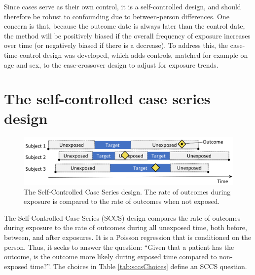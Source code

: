 \documentclass[11pt]{book}
\begin{document}
Since cases serve as their own control, it is a self-controlled design,
and should therefore be robust to confounding due to between-person
differences. One concern is that, because the outcome date is always
later than the control date, the method will be positively biased if the
overall frequency of exposure increases over time (or negatively biased
if there is a decrease). To address this, the case-time-control design
\citep{suissa_1995} was developed, which adds controls, matched for
example on age and sex, to the case-crossover design to adjust for
exposure trends.

\section{The self-controlled case series
design}\label{the-self-controlled-case-series-design}

\begin{figure}

{\centering \includegraphics[width=0.9\linewidth]{images/PopulationLevelEstimation/selfControlledCaseSeries} 

}

\caption{The Self-Controlled Case Series design. The rate of outcomes during exposure is compared to the rate of outcomes when not exposed.}\label{fig:selfControlledCaseSeries}
\end{figure}

The Self-Controlled Case Series (SCCS) design
\citep{farrington_1995, whitaker_2006} compares the rate of outcomes
during exposure to the rate of outcomes during all unexposed time, both
before, between, and after exposures. It is a Poisson regression that is
conditioned on the person. Thus, it seeks to answer the question:
``Given that a patient has the outcome, is the outcome more likely
during exposed time compared to non-exposed time?''. The choices in
Table \ref{tab:sccsChoices} define an SCCS question.
\end{document}
